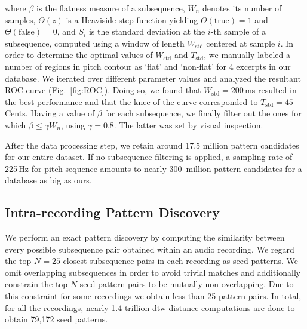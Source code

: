 \noindent where $\beta$ is the flatness measure of a subsequence, $W_n$ denotes its number of samples, $\Theta(z)$ is a Heaviside step function yielding $\Theta(\text{true})\!=\!1$ and $\Theta(\text{false})\!=\!0$, and $S_i$ is the standard deviation at the $i$-th sample of a subsequence, computed using a window of length $W_{\text{std}}$ centered at sample $i$. %
In order to determine the optimal values of $W_{\text{std}}$ and $T_{\text{std}}$, we manually labeled a number of regions in pitch contour as `flat' and `non-flat' for 4 excerpts in our database. We iterated over different parameter values and analyzed the resultant ROC curve (Fig.~\ref{fig:ROC}). %
Doing so, we found that $W_{\text{std}}=200$\,ms resulted in the best performance and that the knee of the curve corresponded to $T_{\text{std}}=45$\,Cents. Having a value of $\beta$ for each subsequence, we finally filter out the ones for which $\beta \leq \gamma W_n$, using $\gamma = 0.8$. The latter was set by visual inspection.



After the data processing step, we retain around 17.5 million pattern candidates for our entire dataset. If no subsequence filtering is applied, a sampling rate of 225\,Hz for pitch sequence amounts to nearly 300~million pattern candidates for a database as big as ours.

\subsection{Intra-recording Pattern Discovery}
\label{sec:intraRecordingPatternDiscovery}

We perform an exact pattern discovery by computing the similarity between every possible subsequence pair obtained within an audio recording. We regard the top $N=25$ closest subsequence pairs in each recording as seed patterns. We omit overlapping subsequences in order to avoid trivial matches and additionally constrain the top $N$ seed pattern pairs to be mutually non-overlapping. Due to this constraint for some recordings we obtain less than 25 pattern pairs. In total, for all the recordings, nearly 1.4 trillion \gls{dtw} distance computations are done to obtain 79,172 seed patterns.

